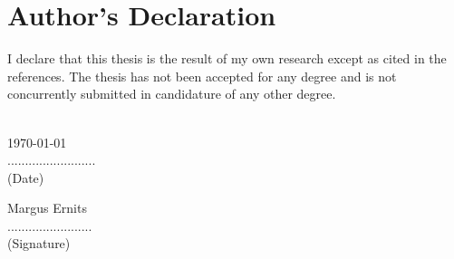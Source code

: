 \clearpage
\chapter*{Author’s Declaration}
\label{declaration}
\thispagestyle{empty}

I declare that this thesis is the result of my own research except as cited in the references. 
The thesis has not been accepted for any degree and is not concurrently submitted in candidature 
of any other degree.
\\
[2cm]\\

\begin{minipage}{0.5\textwidth}
	\begin{flushleft}
	\today \\
		......................... \\
		(Date) 
	\end{flushleft}
\end{minipage}
\begin{minipage}{0.5\textwidth}
	\begin{flushright}
	Margus Ernits \\
	........................ \\
	(Signature) 
	\end{flushright}
\end{minipage}
